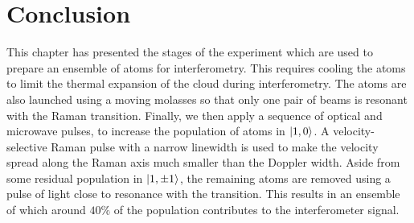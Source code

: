 
\section{Conclusion}
This chapter has presented the stages of the experiment which are used
to prepare an ensemble of atoms for interferometry. This requires
cooling the atoms to limit the thermal expansion of the cloud during
interferometry. The atoms are also launched using a moving molasses so
that only one pair of beams is resonant with the Raman transition.
Finally, we then apply a sequence of optical and microwave pulses, to
increase the population of atoms in \(\ket{1,0}\). A
velocity-selective Raman pulse with a narrow linewidth is used to make
the velocity spread along the Raman axis much smaller than the Doppler
width. Aside from some residual population in \(\ket{1,\pm 1}\), the
remaining atoms are removed using a pulse of light close to resonance
with the  transition. This results in an ensemble of which
around \(40\%\) of the population contributes to the interferometer
signal.

